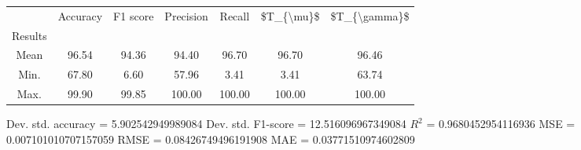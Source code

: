 \begin{tabular}{|c|c|c|c|c|c|c|}
\toprule
{} &  Accuracy &  F1 score &  Precision &  Recall &  \$T\_\{\textbackslash mu\}\$ &  \$T\_\{\textbackslash gamma\}\$ \\
Results &           &           &            &         &            &               \\
\hline
Mean    &     96.54 &     94.36 &      94.40 &   96.70 &      96.70 &         96.46 \\
Min.    &     67.80 &      6.60 &      57.96 &    3.41 &       3.41 &         63.74 \\
Max.    &     99.90 &     99.85 &     100.00 &  100.00 &     100.00 &        100.00 \\
\bottomrule
\end{tabular}

 Dev. std. accuracy = 5.902542949989084
 Dev. std. F1-score = 12.516096967349084
 $R^2$ = 0.9680452954116936
 MSE = 0.007101010707157059
 RMSE = 0.08426749496191908
 MAE = 0.03771510974602809